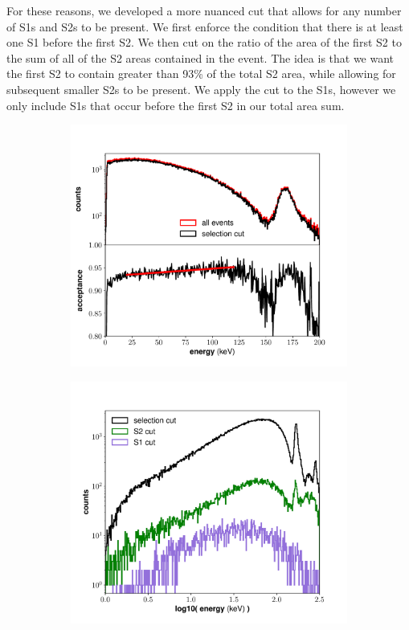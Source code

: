 For these reasons, we developed a more nuanced cut that allows for any number of S1s and S2s to be present. We first enforce the condition that there is at least one S1 before the first S2. We then cut on the ratio of the area of the first S2 to the sum of all of the S2 areas contained in the event. The idea is that we want the first S2 to contain greater than 93\% of the total S2 area, while allowing for subsequent smaller S2s to be present. We apply the cut to the S1s, however we only include S1s that occur before the first S2 in our total area sum.  
\begin{figure}[h!]
\centering
\begin{subfigure}{0.5\textwidth}
  \centering
  \includegraphics[width=\textwidth]{Figures/DataSelection_singlescatter_new}
\end{subfigure}%
\begin{subfigure}{0.5\textwidth}
  \centering
  \includegraphics[width=\textwidth]{Figures/DataSelection_multiS1S2_new}

\end{subfigure}
\end{figure}
